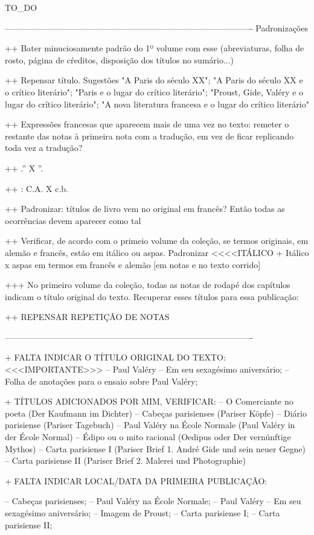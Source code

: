 TO_DO

----------------------------------------------------------------------------------------
Padronizações

++ Bater minuciosamente padrão do 1º volume com esse (abreviaturas, folha de rosto, página de cŕeditos, disposição dos títulos no sumário...)

++ Repensar título. Sugestões "A Paris do século XX"; "A Paris do século XX e o crítico literário"; "Paris e o lugar do crítico literário"; "Proust, Gide, Valéry e o lugar do crítico literário"; "A nova literatura francesa e o lugar do crítico literário"

++ Expressões francesas que aparecem mais de uma vez no texto: remeter o restante das notas à primeira nota com a tradução, em vez de ficar replicando toda vez a tradução?

++ .'' X ''.

++ : C.A. X c.b.

++ Padronizar: títulos de livro vem no original em francês? Então todas as ocorrências devem aparecer como tal

++ Verificar, de acordo com o primeio volume da coleção, se termos originais, em alemão e francês, estão em itálico ou aspas. Padronizar <<<<ITÁLICO
+ Itálico x aspas em termos em francês e alemão [em notas e no texto corrido]

+++ No primeiro volume da coleção, todas as notas de rodapé dos capítulos indicam o título original do texto. Recuperar esses títulos para essa publicação:

++ REPENSAR REPETIÇÃO DE NOTAS

----------------------------------------------------------------------------------------

+ FALTA INDICAR O TÍTULO ORIGINAL DO TEXTO: <<<IMPORTANTE>>>
-- Paul Valéry – Em seu sexagésimo aniversário;
-- Folha de anotações para o ensaio sobre Paul Valéry;

+ TÍTULOS ADICIONADOS POR MIM, VERIFICAR:
-- O Comerciante no poeta (Der Kaufmann im Dichter)
-- Cabeças parisienses (Pariser Köpfe)
-- Diário parisiense (Pariser Tagebuch)
-- Paul Valéry na École Normale (Paul Valéry in der École Normal)
-- Édipo ou o mito racional (Oedipus oder Der vernünftige Mythos)
-- Carta parisiense I (Pariser Brief 1. André Gide und sein neuer Gegne)
-- Carta parisiense II (Pariser Brief 2. Malerei und Photographie)

+ FALTA INDICAR LOCAL/DATA DA PRIMEIRA PUBLICAÇÃO:

-- Cabeças parisienses; 
-- Paul Valéry na École Normale;
-- Paul Valéry – Em seu sexagésimo aniversário;
-- Imagem de Proust; 
-- Carta parisiense I;
-- Carta parisiense II;

